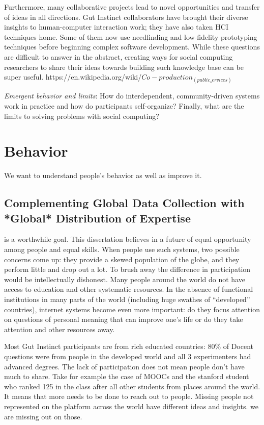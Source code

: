 Furthermore, many collaborative projects lead to novel opportunities and transfer of ideas in all directions. Gut Instinct collaborators have brought their diverse insights to human-computer interaction work; they have also taken HCI techniques home. Some of them now use needfinding and low-fidelity prototyping techniques before beginning complex software development. While these questions are difficult to answer in the abstract, creating ways for social computing researchers to share their ideas towards building such knowledge base can be super useful.    https://en.wikipedia.org/wiki/$Co-production_(public_services)$

\textit{Emergent behavior and limits}: How do interdependent, community-driven systems work in practice and how do participants self-organize? Finally, what are the limits to solving problems with social computing? 


\section{Behavior} 

We want to understand people's behavior as well as improve it. 

\subsection{Complementing Global Data Collection with *Global* Distribution of Expertise} is a worthwhile goal. This dissertation believes in a future of equal opportunity among people and equal skills. When people use such systems, two possible concerns come up: they provide a skewed population of the globe, and they perform little and drop out a lot.  To brush away the difference in participation would be intellectually dishonest. Many people around the world do not have access to education and other systematic resources. In the absence of functional institutions in many parts of the world (including huge swathes of “developed” countries), internet systems become even more important:  do they focus attention on questions of personal meaning that can improve one’s life or do they take attention and other resources away. 

Most Gut Instinct participants are from rich educated countries: 80\% of Docent questions were from people in the developed world and all 3 experimenters had advanced degrees. The lack of participation does not mean people don’t have much to share. Take for example the case of MOOCs and the stanford student who ranked 125 in the class after all other students from places around the world. It means that more needs to be done  to reach out to people.  Missing people not represented on the platform across the world have different ideas and insights. we are missing out on those. 

